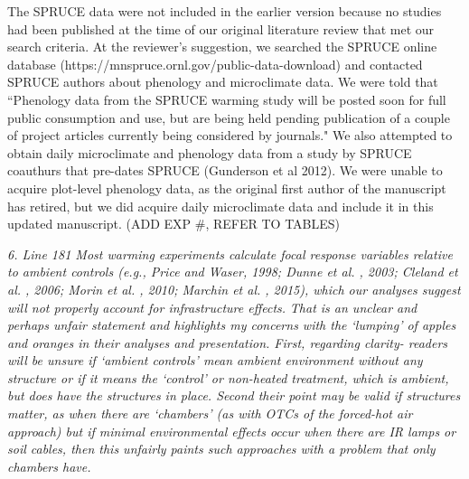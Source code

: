 \documentclass[11pt,a4paper]{letter}
\begin{document}
\begin{letter}{}
\par The SPRUCE data were not included in the earlier version because no studies had been published at the time of our original literature review that met our search criteria.  At the reviewer's suggestion, we searched the SPRUCE online database (https://mnspruce.ornl.gov/public-data-download) and contacted SPRUCE authors about phenology and microclimate data. We were told that ``Phenology data from the SPRUCE warming study will be posted soon for full public consumption and use, but are being held pending publication of a couple of project articles currently being considered by journals." We also attempted to obtain daily microclimate and phenology data from a study by SPRUCE coauthurs that pre-dates SPRUCE (Gunderson et al 2012). We were unable to acquire plot-level phenology data, as the original first author of the manuscript has retired, but we did acquire daily microclimate data and include it in this updated manuscript. (ADD EXP #, REFER TO TABLES)
\\
\par \emph{6. Line 181 Most warming experiments calculate focal response variables relative to ambient controls (e.g., Price and Waser, 1998; Dunne et al. , 2003; Cleland et al. , 2006; Morin et al. , 2010; Marchin et al. , 2015), which our analyses suggest will not properly account for infrastructure effects.}
\emph{That is an unclear and perhaps unfair statement and highlights my concerns with the `lumping' of apples and oranges in their analyses and presentation. First, regarding clarity- readers will be unsure if `ambient controls' mean ambient environment without any structure or if it means the `control' or non-heated treatment, which is ambient, but does have the structures in place. Second their point may be valid if structures matter, as when there are `chambers' (as with OTCs of the forced-hot air approach) but if minimal environmental effects occur when there are IR lamps or soil cables, then this unfairly paints such approaches with a problem that only chambers have.}


\end{letter}
\end{document}

